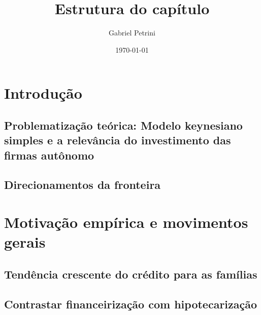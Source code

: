 \documentclass[11pt]{article}
\author{Gabriel Petrini}
\date{\today}
\title{Estrutura do capítulo}
\begin{document}
\maketitle

\section{Introdução}
\label{sec:orga50d742}
\subsection{Problematização teórica: Modelo keynesiano simples e a relevância do investimento das firmas autônomo}
\label{sec:orgd61b7a9}



\subsection{Direcionamentos da fronteira}
\label{sec:org71d83af}









\section{Motivação empírica e movimentos gerais}
\label{sec:orgc0ecdab}

\subsection{Tendência crescente do crédito para as famílias}
\label{sec:orgea69fc1}








\subsection{Contrastar financeirização com hipotecarização}
\label{sec:orgaaa152c}
\end{document}
